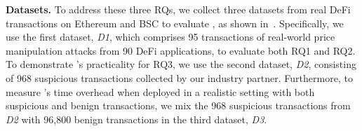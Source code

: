 

\noindent
\textbf{Datasets.}
To address these three RQs, we collect three datasets from real DeFi transactions on Ethereum and BSC to evaluate \name, as shown in~.
Specifically, we use the first dataset, \textit{D1}, which comprises 95 transactions of real-world price manipulation attacks from 90 DeFi applications, to evaluate both RQ1 and RQ2.
To demonstrate \name's practicality for RQ3, we use the second dataset, \textit{D2}, consisting of 968 suspicious transactions collected by our industry partner.
Furthermore, to measure \name's time overhead when deployed in a realistic setting with both suspicious and benign transactions, we mix the 968 suspicious transactions from \textit{D2} with 96,800 benign transactions in the third dataset, \textit{D3}.

